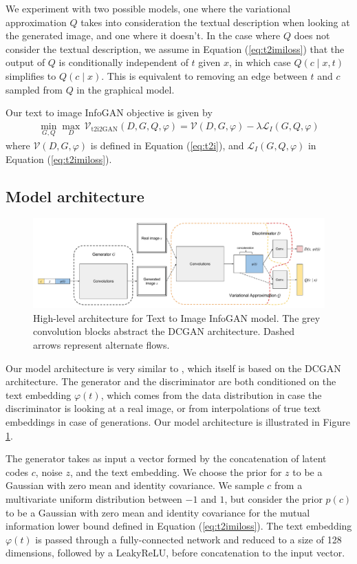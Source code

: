 \documentclass{article}
\begin{document}
We experiment with two possible models, one where the variational approximation $Q$ takes into consideration the textual description when looking at the generated image, and one where it doesn't. In the case where $Q$ does not consider the textual description, we assume in Equation (\ref{eq:t2imiloss}) that the output of $Q$ is conditionally independent of $t$ given $x$, in which case $Q(c\mid x,t)$ simplifies to $Q(c\mid x)$. This is equivalent to removing an edge between $t$ and $c$ sampled from $Q$ in the graphical model.

Our text to image InfoGAN objective is given by
\begin{align}
\min_{G,Q} \max_D\, \mathcal{V}_{\text{t2i2GAN}}(D,G,Q,\varphi) = \mathcal{V}(D,G,\varphi) - \lambda \mathcal{L}_I(G,Q,\varphi)
\end{align}
where $\mathcal{V}(D,G,\varphi)$ is defined in Equation (\ref{eq:t2i}), and $\mathcal{L}_I(G,Q,\varphi)$ in Equation (\ref{eq:t2imiloss}).


\subsection{Model architecture}

\begin{figure}
    \centering
    \includegraphics[width=\textwidth]{arch}
    \caption{High-level architecture for Text to Image InfoGAN model. The grey convolution blocks abstract the DCGAN architecture. Dashed arrows represent alternate flows.}
    \label{fig:arch}
\end{figure}

Our model architecture is very similar to \cite{text2image}, which itself is based on the DCGAN architecture. The generator and the discriminator are both conditioned on the text embedding $\varphi(t)$, which comes from the data distribution in case the discriminator is looking at a real image, or from interpolations of true text embeddings in case of generations. Our model architecture is illustrated in Figure \ref{fig:arch}.

The generator takes as input a vector formed by the concatenation of latent codes $c$, noise $z$, and the text embedding. We choose the prior for $z$ to be a Gaussian with zero mean and identity covariance. We sample $c$ from a multivariate uniform distribution between $-1$ and $1$, but consider the prior $p(c)$ to be a Gaussian with zero mean and identity covariance for the mutual information lower bound defined in Equation (\ref{eq:t2imiloss}). The text embedding $\varphi(t)$ is passed through a fully-connected network and reduced to a size of 128 dimensions, followed by a LeakyReLU, before concatenation to the input vector.
\end{document}
